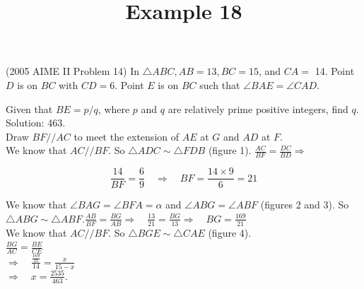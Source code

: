 \documentclass{article}
\title{Example 18}
\date{}
\begin{document}
\maketitle

(2005 AIME II Problem 14) In \(\triangle A B C, A B=13, B C=15\), and \(C A=\) 14. Point \(D\) is on \(B C\) with \(C D=6\). Point \(E\) is on \(B C\) such that \(\angle B A E=\angle C A D\).

Given that \(B E=p / q\), where \(p\) and \(q\) are relatively prime positive integers, find \(q\).\\
Solution: 463.\\
Draw \(B F / / A C\) to meet the extension of \(A E\) at \(G\) and \(A D\) at \(F\).\\
We know that \(A C / / B F\). So \(\triangle A D C \sim \triangle F D B\) (figure 1). \(\frac{A C}{B F}=\frac{D C}{B D} \Rightarrow\)

\[
\frac{14}{B F}=\frac{6}{9} \quad \Rightarrow \quad B F=\frac{14 \times 9}{6}=21
\]

We know that \(\angle B A G=\angle B F A=\alpha\) and \(\angle A B G=\angle A B F\) (figures 2 and 3). So \(\triangle A B G \sim \triangle A B F . \frac{A B}{B F}=\frac{B G}{A B} \Rightarrow \quad \frac{13}{21}=\frac{B G}{13} \Rightarrow \quad B G=\frac{169}{21}\)\\
We know that \(A C / / B F\). So \(\triangle B G E \sim \triangle C A E\) (figure 4).\\
\(\frac{B G}{A C}=\frac{B E}{C E}\)\\
\(\Rightarrow \quad \frac{\frac{169}{21}}{14}=\frac{x}{15-x}\)\\
\(\Rightarrow \quad x=\frac{2535}{463}\).
\end{document}

